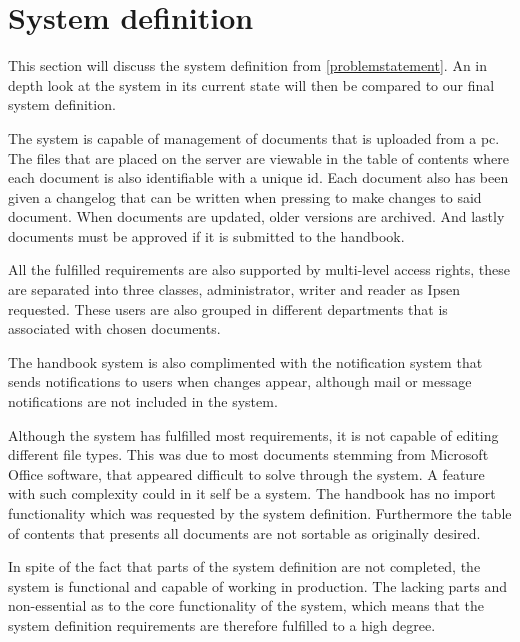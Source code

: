 \section{System definition}\label{sec:dissystemdef}
This section will discuss the system definition from \cref{problemstatement}.
An in depth look at the system in its current state will then be compared to our final system definition.

The system is capable of management of documents that is uploaded from a pc.
The files that are placed on the server are viewable in the table of contents where each document is also identifiable with a unique id.
Each document also has been given a changelog that can be written when pressing to make changes to said document.
When documents are updated, older versions are archived.
And lastly documents must be approved if it is submitted to the handbook.

All the fulfilled requirements are also supported by multi-level access rights, these are separated into three classes, administrator, writer and reader as Ipsen requested.
These users are also grouped in different departments that is associated with chosen documents.

The handbook system is also complimented with the notification system that sends notifications to users when changes appear, although mail or message notifications are not included in the system.

Although the system has fulfilled most requirements, it is not capable of editing different file types.
This was due to most documents stemming from Microsoft Office software, that appeared difficult to solve through the system.
A feature with such complexity could in it self be a system.
The handbook has no import functionality which was requested by the system definition.
Furthermore the table of contents that presents all documents are not sortable as originally desired.

In spite of the fact that parts of the system definition are not completed, the system is functional and capable of working in production.
The lacking parts and non-essential as to the core functionality of the system, which means that the system definition requirements are therefore fulfilled to a high degree.


